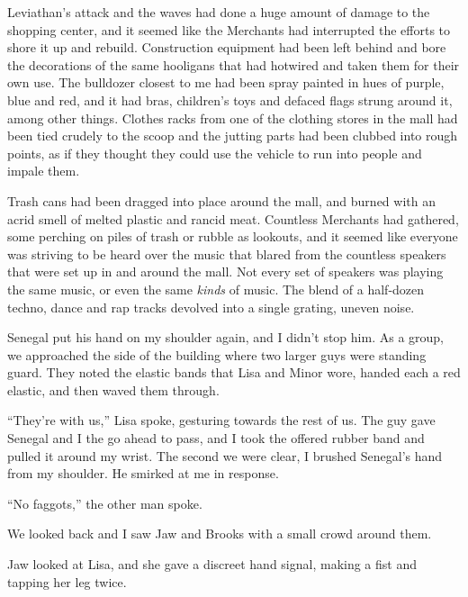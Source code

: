 





Leviathan's attack and the waves had done a huge amount of damage to the shopping center, and it seemed like the Merchants had interrupted the efforts to shore it up and rebuild.  Construction equipment had been left behind and bore the decorations of the same hooligans that had hotwired and taken them for their own use.  The bulldozer closest to me had been spray painted in hues of purple, blue and red, and it had bras, children's toys and defaced flags strung around it, among other things.  Clothes racks from one of the clothing stores in the mall had been tied crudely to the scoop and the jutting parts had been clubbed into rough points, as if they thought they could use the vehicle to run into people and impale them.



Trash cans had been dragged into place around the mall, and burned with an acrid smell of melted plastic and rancid meat.  Countless Merchants had gathered, some perching on piles of trash or rubble as lookouts, and it seemed like everyone was striving to be heard over the music that blared from the countless speakers that were set up in and around the mall.  Not every set of speakers was playing the same music, or even the same \emph{kinds} of music.  The blend of a half-dozen techno, dance and rap tracks devolved into a single grating, uneven noise.



Senegal put his hand on my shoulder again, and I didn't stop him.  As a group, we approached the side of the building where two larger guys were standing guard. They noted the elastic bands that Lisa and Minor wore, handed each a red elastic, and then waved them through.



``They're with us,'' Lisa spoke, gesturing towards the rest of us.  The guy gave Senegal and I the go ahead to pass, and I took the offered rubber band and pulled it around my wrist.  The second we were clear, I brushed Senegal's hand from my shoulder.  He smirked at me in response.



``No faggots,'' the other man spoke.



We looked back and I saw Jaw and Brooks with a small crowd around them.



Jaw looked at Lisa, and she gave a discreet hand signal, making a fist and tapping her leg twice.



